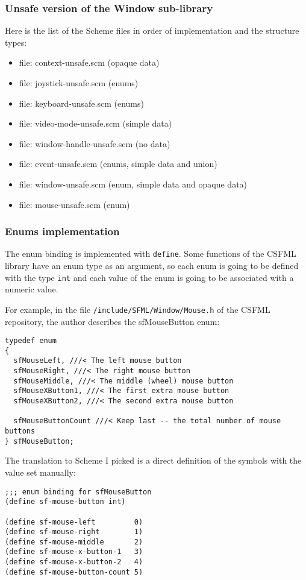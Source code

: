 \documentclass[latterpaper, leqno]{article}
\begin{document}
\subsubsection*{Unsafe version of the Window sub-library}
Here is the list of the Scheme files in order of implementation and the structure types:

\begin{itemize}
  \item file: context-unsafe.scm (opaque data)
  \item file: joystick-unsafe.scm (enums)
  \item file: keyboard-unsafe.scm (enums)
  \item file: video-mode-unsafe.scm (simple data)
  \item file: window-handle-unsafe.scm (no data)
  \item file: event-unsafe.scm (enums, simple data and union)
  \item file: window-unsafe.scm (enum, simple data and opaque data)
  \item file: mouse-unsafe.scm (enum)
\end{itemize}

\subsubsection*{Enums implementation}
The enum binding is implemented with \texttt{define}. Some functions of the CSFML library have an enum type as an argument, so each enum is going to be defined with the type \texttt{int} and each value of the enum is going to be associated with a numeric value.

For example, in the file \texttt{/include/SFML/Window/Mouse.h} of the CSFML repository, the author describes the sfMouseButton enum:

\begin{verbatim}
typedef enum
{
  sfMouseLeft, ///< The left mouse button
  sfMouseRight, ///< The right mouse button
  sfMouseMiddle, ///< The middle (wheel) mouse button
  sfMouseXButton1, ///< The first extra mouse button
  sfMouseXButton2, ///< The second extra mouse button
  
  sfMouseButtonCount ///< Keep last -- the total number of mouse buttons
} sfMouseButton;
\end{verbatim}

The translation to Scheme I picked is a direct definition of the symbols with the value set manually:

\begin{verbatim}
;;; enum binding for sfMouseButton
(define sf-mouse-button int)

(define sf-mouse-left         0)
(define sf-mouse-right        1)
(define sf-mouse-middle       2)
(define sf-mouse-x-button-1   3)
(define sf-mouse-x-button-2   4)
(define sf-mouse-button-count 5)
\end{verbatim}
\end{document}
